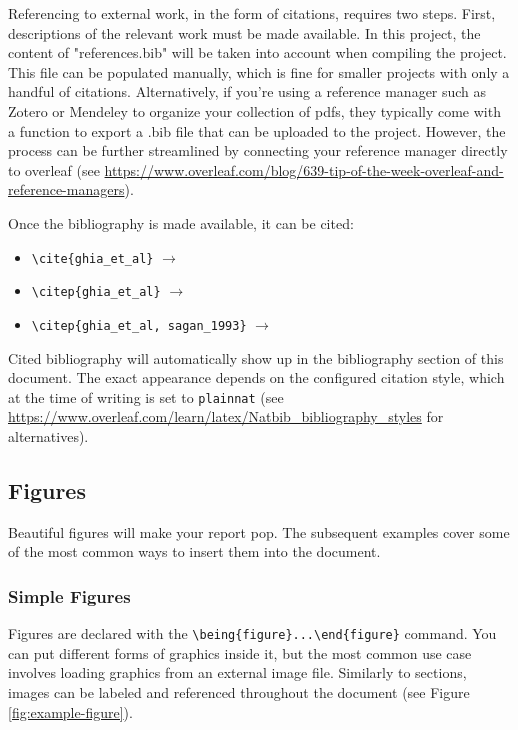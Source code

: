 Referencing to external work, in the form of citations, requires two steps.
First, descriptions of the relevant work must be made available.
In this project, the content of "references.bib" will be taken into account when compiling the project.
This file can be populated manually, which is fine for smaller projects with only a handful of citations.
Alternatively, if you're using a reference manager such as Zotero or Mendeley to organize your collection of pdfs, they typically come with a function to export a .bib file that can be uploaded to the project.
However, the process can be further streamlined by connecting your reference manager directly to overleaf (see \url{https://www.overleaf.com/blog/639-tip-of-the-week-overleaf-and-reference-managers}).

Once the bibliography is made available, it can be cited:

\begin{itemize}
    \item \verb|\cite{ghia_et_al}| $\rightarrow$ \cite{ghia_et_al}
    \item \verb|\citep{ghia_et_al}| $\rightarrow$ \citep{ghia_et_al}
    \item \verb|\citep{ghia_et_al, sagan_1993}| $\rightarrow$ \citep{ghia_et_al, sagan_1993}
\end{itemize}

Cited bibliography will automatically show up in the bibliography section of this document. 
The exact appearance depends on the configured citation style, which at the time of writing is set to \verb|plainnat| (see \url{https://www.overleaf.com/learn/latex/Natbib_bibliography_styles} for alternatives).


\subsection{Figures}

Beautiful figures will make your report pop. The subsequent examples cover some of the most common ways to insert them into the document.

\subsubsection{Simple Figures}

Figures are declared with the \verb|\being{figure}...\end{figure}| command.
You can put different forms of graphics inside it, but the most common use case involves loading graphics from an external image file.
Similarly to sections, images can be labeled and referenced throughout the document (see Figure \ref{fig:example-figure}).

